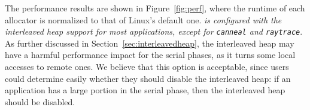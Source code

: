 


The performance results are shown in Figure~\ref{fig:perf}, where the runtime of each allocator is normalized to that of Linux's default one. \textit{\NM{} is configured with the interleaved heap support for most applications, except for \texttt{canneal} and \texttt{raytrace}}. As further discussed in Section~\ref{sec:interleavedheap}, the interleaved heap may have a harmful performance impact for the serial phases, as it turns some local accesses to remote ones. %
We believe that this option is acceptable, since users could determine easily whether they should disable the interleaved heap: if an application has a large portion in the serial phase, then the interleaved heap should be disabled. 





